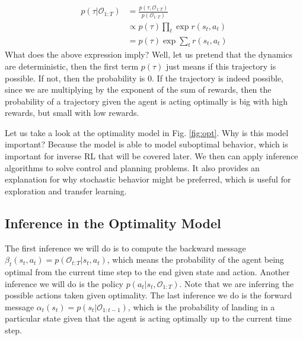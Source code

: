\begin{align*}
    p(\tau|\mathcal{O}_{1:T}) &= \frac{p(\tau,\mathcal{O}_{1:T})}{p(\mathcal{O}_{1:T})}\\
    &\propto p(\tau)\prod_t \exp{r(s_t,a_t)}\\
    &= p(\tau)\exp{\sum_t r(s_t,a_t)}
\end{align*}
What does the above expression imply? Well, let us pretend that the dynamics are deterministic, then the first term $p(\tau)$ just means if this trajectory is possible. If not, then the probability is 0. If the trajectory is indeed possible, since we are multiplying by the exponent of the sum of rewards, then the probability of a trajectory given the agent is acting optimally is big with high rewards, but small with low rewards.

Let us take a look at the optimality model in Fig. \ref{fig:opt}. Why is this model important? Because the model is able to model suboptimal behavior, which is important for inverse RL that will be covered later. We then can apply inference algorithms to solve control and planning problems. It also provides an explanation for why stochastic behavior might be preferred, which is useful for exploration and transfer learning.

\subsection{Inference in the Optimality Model}
The first inference we will do is to compute the backward message $\beta_t(s_t,a_t) = p(\mathcal{O}_{t:T}|s_t,a_t)$, which means the probability of the agent being optimal from the current time step to the end given state and action. Another inference we will do is the policy $p(a_t|s_t,\mathcal{O}_{1:T})$. Note that we are inferring the possible actions taken given optimality. The last inference we do is the forward message $\alpha_t(s_t) = p(s_t|\mathcal{O}_{1:t-1})$, which is the probability of landing in a particular state given that the agent is acting optimally up to the current time step. 

